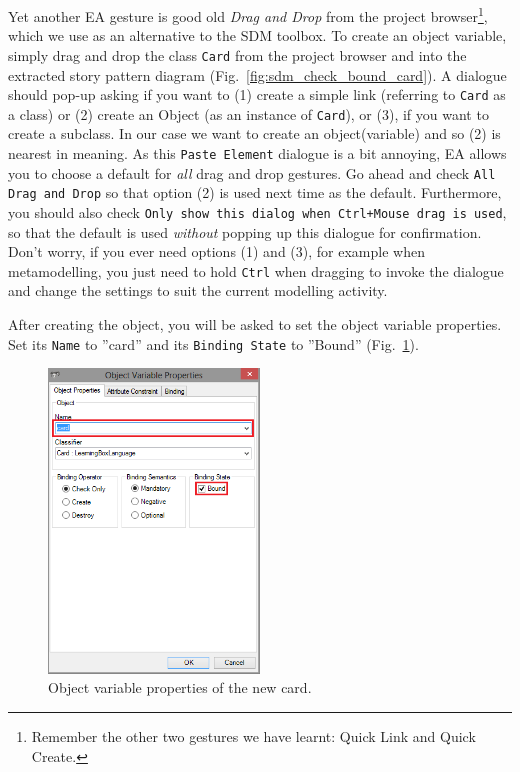 Yet another EA gesture is good old \emph{Drag and Drop} from the project
browser\footnote{Remember the other two gestures we have learnt:  Quick Link
and Quick Create.}, which we use as an alternative to the SDM toolbox.
To create an object variable, simply drag and drop the class
\texttt{Card} from the project browser and into the extracted story
pattern diagram (Fig.~\ref{fig:sdm_check_bound_card}).  A dialogue should pop-up
asking if you want to (1) create a simple link (referring to \texttt{Card} as a
class) or (2) create an Object (as an instance of \texttt{Card}), or (3), if you
want to create a subclass.  In our case we want to create an object(variable)
and so (2) is nearest in meaning.  As this \texttt{Paste Element} dialogue is a
bit annoying, EA  allows you to choose a default for \emph{all} drag and drop
gestures.  Go ahead and check \texttt{All Drag and Drop} so that option (2) is
used next time as the default.  Furthermore, you should also check
\texttt{Only show this dialog when Ctrl+Mouse drag is used}, so that the
default is used \emph{without} popping up this dialogue for confirmation. Don't worry,
if you ever need options (1) and (3), for example when metamodelling, you  just
need to hold \texttt{Ctrl} when dragging to invoke the dialogue and change  the
settings to suit the current modelling activity.

After creating the object, you will be asked to set the object variable properties. Set its \texttt{Name} to ''card'' and its \texttt{Binding State} to ''Bound'' (Fig.~\ref{fig:sdm_new_card_properties}).

\begin{figure}[htbp]
\begin{center}
  \includegraphics[width=0.5\textwidth]{pics/sdmBilder/check/sdm23.png}
  \caption{Object variable properties of the new card.}
  \label{fig:sdm_new_card_properties}
\end{center}
\end{figure}

